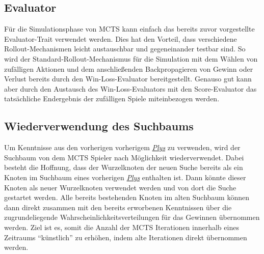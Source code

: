 \subsection{Evaluator}

Für die Simulationsphase von \ac{MCTS} kann einfach das bereits zuvor vorgestellte Evaluator-Trait verwendet werden. Dies hat den Vorteil, dass verschiedene Rollout-Mechanismen leicht austauschbar und gegeneinander testbar sind. So wird der Standard-Rollout-Mechanismus für die Simulation mit dem Wählen von zufälligen Aktionen und dem anschließenden Backpropagieren von Gewinn oder Verlust bereits durch den Win-Loss-Evaluator bereitgestellt. Genauso gut kann aber durch den Austausch des Win-Loss-Evaluators mit den Score-Evaluator das tatsächliche Endergebnis der zufälligen Spiele miteinbezogen werden.

\subsection{Wiederverwendung des Suchbaums}

Um Kenntnisse aus den vorherigen vorherigem \hyperref[text:ply]{\emph{Plys}} zu verwenden, wird der Suchbaum von dem \ac{MCTS} Spieler nach Möglichkeit wiederverwendet. Dabei besteht die Hoffnung, dass der Wurzelknoten der neuen Suche bereits als ein Knoten im Suchbaum eines vorherigen \hyperref[text:ply]{\emph{Plys}} enthalten ist. Dann könnte dieser Knoten als neuer Wurzelknoten verwendet werden und von dort die Suche gestartet werden. Alle bereits bestehenden Knoten im alten Suchbaum können dann direkt zusammen mit den bereits erworbenen Kenntnissen über die zugrundeliegende Wahrscheinlichkeitsverteilungen für das Gewinnen übernommen werden. Ziel ist es, somit die Anzahl der \ac{MCTS} Iterationen innerhalb eines Zeitraums \enquote{künstlich} zu erhöhen, indem alte Iterationen direkt übernommen werden.

